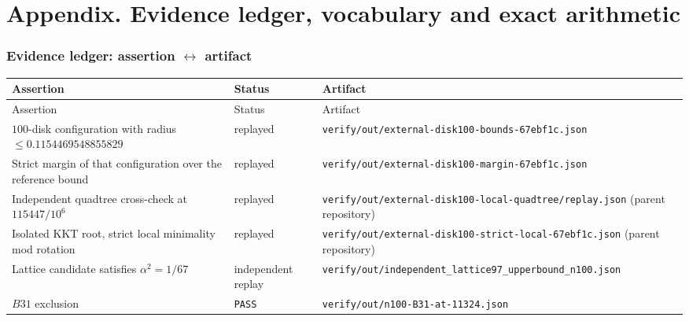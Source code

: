 \appendix
\part*{Appendix. Evidence ledger, vocabulary and exact arithmetic}
\setcounter{section}{0}

\section{Evidence ledger: assertion $\leftrightarrow$ artifact}

{\footnotesize
\begin{longtable}{@{}@{}>{\raggedright\arraybackslash}p{}>{\raggedright\arraybackslash}p{}>{\raggedright\arraybackslash}p{}@{}}
\toprule
Assertion & Status & Artifact \\
\midrule
\endfirsthead
\toprule
Assertion & Status & Artifact \\
\midrule
\endhead
\bottomrule
\endlastfoot
$100$-disk configuration with radius $\le0.1154469548855829$ & replayed &
{\footnotesize\texttt{verify/\allowbreak{}out/\allowbreak{}external-\allowbreak{}disk100-\allowbreak{}bounds-\allowbreak{}67ebf1c.json}} \\
Strict margin of that configuration over the reference bound & replayed &
{\footnotesize\texttt{verify/\allowbreak{}out/\allowbreak{}external-\allowbreak{}disk100-\allowbreak{}margin-\allowbreak{}67ebf1c.json}} \\
Independent quadtree cross-check at $115447/10^{6}$ & replayed &
\texttt{verify/\allowbreak{}out/\allowbreak{}external-\allowbreak{}disk100-\allowbreak{}local-\allowbreak{}quadtree/\allowbreak{}replay.json} (parent repository) \\
Isolated KKT root, strict local minimality mod rotation & replayed &
{\footnotesize\texttt{verify/\allowbreak{}out/\allowbreak{}external-\allowbreak{}disk100-\allowbreak{}strict-\allowbreak{}local-\allowbreak{}67ebf1c.json}} (parent repository) \\
Lattice candidate satisfies $\alpha^2=1/67$ & independent replay &
{\footnotesize\texttt{verify/\allowbreak{}out/\allowbreak{}independent\_\allowbreak{}lattice97\_\allowbreak{}upperbound\_\allowbreak{}n100.json}} \\
$B31$ exclusion & \texttt{PASS} & \texttt{verify/\allowbreak{}out/\allowbreak{}n100-\allowbreak{}B31-\allowbreak{}at-\allowbreak{}11324.json} \\

\end{longtable}}
